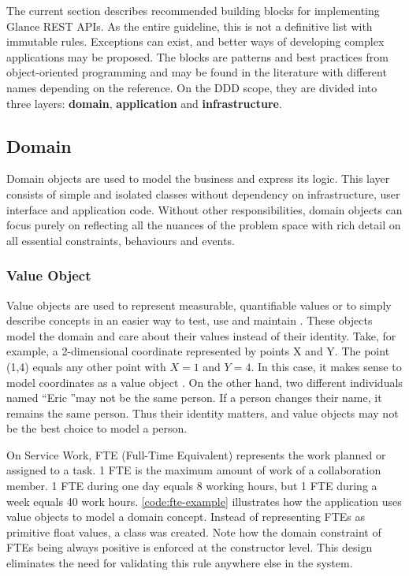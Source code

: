 The current section describes recommended building blocks for implementing Glance REST APIs. As the entire guideline, this is not a definitive list with immutable rules. Exceptions can exist, and better ways of developing complex applications may be proposed. The blocks are patterns and best practices from object-oriented programming and may be found in the literature with different names depending on the reference. On the DDD scope, they are divided into three layers: \textbf{domain}, \textbf{application} and \textbf{infrastructure}. 

\subsection{Domain}

Domain objects are used to model the business and express its logic. This layer consists of simple and isolated classes without dependency on infrastructure, user interface and application code. Without other responsibilities, domain objects can focus purely on reflecting all the nuances of the problem space with rich detail on all essential constraints, behaviours and events.

\subsubsection{Value Object}
\label{sec:value-object}

Value objects \cite{ddd-blue-book} \cite{ddd-reference} are used to represent measurable, quantifiable values or to simply describe concepts in an easier way to test, use and maintain \cite{ddd-red-book}. These objects model the domain and care about their values instead of their identity. Take, for example, a 2-dimensional coordinate represented by points X and Y. The point (1,4) equals any other point with $X = 1$ and $Y = 4$. In this case, it makes sense to model coordinates as a value object \cite{fowler-value-objects}. On the other hand, two different individuals named ``Eric ''may not be the same person. If a person changes their name, it remains the same person. Thus their identity matters, and value objects may not be the best choice to model a person.

On Service Work, FTE (Full-Time Equivalent) represents the work planned or assigned to a task. 1 FTE is the maximum amount of work of a collaboration member. 1 FTE during one day equals 8 working hours, but 1 FTE during a week equals 40 work hours. \autoref{code:fte-example} illustrates how the application uses value objects to model a domain concept. Instead of representing FTEs as primitive float values, a class was created. Note how the domain constraint of FTEs being always positive is enforced at the constructor level. This design eliminates the need for validating this rule anywhere else in the system.

